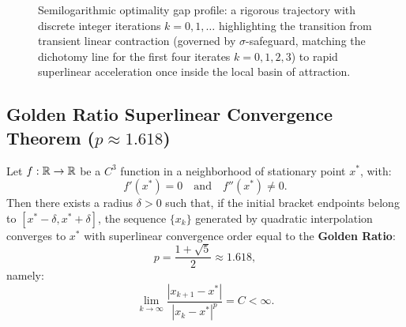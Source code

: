 \begin{figure}[htbp]
\caption{Semilogarithmic optimality gap profile: a rigorous trajectory with discrete integer iterations $k = 0, 1, \dots$ highlighting the transition from transient linear contraction (governed by $\sigma$-safeguard, matching the dichotomy line for the first four iterates $k=0,1,2,3$) to rapid superlinear acceleration once inside the local basin of attraction.}
\label{fig:semilog-convergence-profile-en}
\end{figure}

\subsection{Golden Ratio Superlinear Convergence Theorem ($p \approx 1.618$)}
\begin{theorem}
\label{thm:quadratic-interpolation-superlinear-en}
Let $f: \mathbb{R} \to \mathbb{R}$ be a $C^3$ function in a neighborhood of stationary point $x^*$, with:
\begin{equation}
    f'(x^*) = 0 \quad \text{and} \quad f''(x^*) \ne 0.
\end{equation}
Then there exists a radius $\delta > 0$ such that, if the initial bracket endpoints belong to $[x^* - \delta, x^* + \delta]$, the sequence $\{x_k\}$ generated by quadratic interpolation converges to $x^*$ with superlinear convergence order equal to the \textbf{Golden Ratio}:
\begin{equation}
    p = \frac{1 + \sqrt{5}}{2} \approx 1.618,
\end{equation}
namely:
\begin{equation}
    \lim_{k \to \infty} \frac{|x_{k+1} - x^*|}{|x_k - x^*|^p} = C < \infty.
\end{equation}
\end{theorem}

